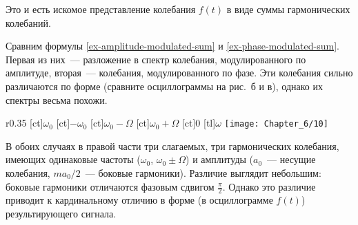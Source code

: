 Это и есть искомое представление колебания $f(t)$ в виде суммы гармонических
колебаний.

Сравним формулы \eqref{ex-amplitude-modulated-sum} и
\eqref{ex-phase-modulated-sum}. Первая из них~--- разложение в спектр колебания,
модулированного по амплитуде,
вторая~--- колебания, модулированного по фазе. Эти колебания сильно различаются
по форме (сравните осциллограммы на
рис.~б и в), однако
их спектры весьма похожи.

\begin{wrapfigure}{r}{0.35\textwidth}
    \small
    [ct]{$\omega_0$}
    [ct]{$-\omega_0$}
    [ct]{$\omega_0-\Omega$}
    [ct]{$\omega_0+\Omega$}
    [ct]{0}
    [tl]{$\omega$}
    \texttt{[image: Chapter\_6/10]}
    \caption{}
\end{wrapfigure}

В обоих случаях в правой части три слагаемых, три гармонических колебания,
имеющих одинаковые частоты ($\omega_0$,
$\omega_0\pm\Omega$) и амплитуды ($a_0$~--- несущие колебания, $ma_0/2$~---
боковые гармоники). Различие выглядит
небольшим: боковые гармоники отличаются фазовым сдвигом $\frac{\pi}{2}$. Однако
это различие приводит к кардинальному
отличию в форме (в осциллограмме $f(t)$) результирующего сигнала.


%

